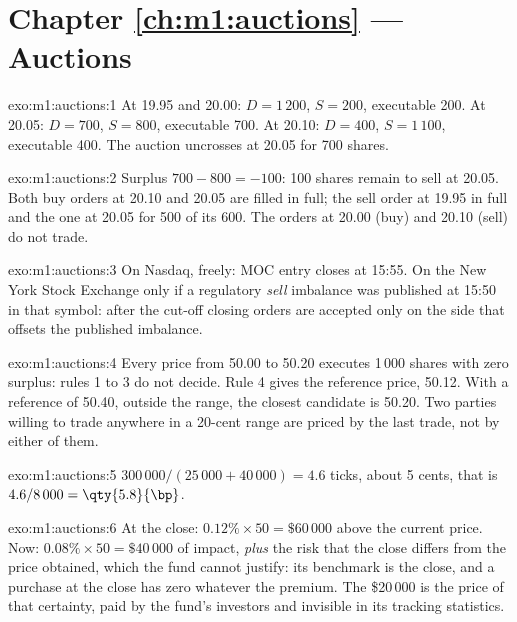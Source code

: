 \section*{Chapter \ref{ch:m1:auctions} --- Auctions}

\begin{solution}{exo:m1:auctions:1}
At 19.95 and 20.00: $D = 1\,200$, $S = 200$, executable 200. At 20.05: $D =
700$, $S = 800$, executable 700. At 20.10: $D = 400$, $S = 1\,100$,
executable 400. The auction uncrosses at 20.05 for 700 shares.
\end{solution}

\begin{solution}{exo:m1:auctions:2}
Surplus $700 - 800 = -100$: 100 shares remain to sell at 20.05. Both buy
orders at 20.10 and 20.05 are filled in full; the sell order at 19.95 in full
and the one at 20.05 for 500 of its 600. The orders at 20.00 (buy) and 20.10
(sell) do not trade.
\end{solution}

\begin{solution}{exo:m1:auctions:3}
On Nasdaq, freely: MOC entry closes at 15:55. On the New York Stock Exchange
only if a regulatory \emph{sell} imbalance was published at 15:50 in that
symbol: after the cut-off closing orders are accepted only on the side that
offsets the published imbalance.
\end{solution}

\begin{solution}{exo:m1:auctions:4}
Every price from 50.00 to 50.20 executes 1\,000 shares with zero surplus:
rules 1 to 3 do not decide. Rule 4 gives the reference price, 50.12. With a
reference of 50.40, outside the range, the closest candidate is 50.20. Two
parties willing to trade anywhere in a 20-cent range are priced by the last
trade, not by either of them.
\end{solution}

\begin{solution}{exo:m1:auctions:5}
$300\,000/(25\,000 + 40\,000) = 4.6$ ticks, about 5 cents, that is
$4.6/8\,000 = \qty{5.8}{\bp}$.
\end{solution}

\begin{solution}{exo:m1:auctions:6}
At the close: $0.12\% \times 50 = \$60\,000$ above the current price. Now:
$0.08\% \times 50 = \$40\,000$ of impact, \emph{plus} the risk that the close
differs from the price obtained, which the fund cannot justify: its
benchmark is the close, and a purchase at the close has zero 
whatever the premium. The \$20\,000 is the price of that certainty, paid by
the fund's investors and invisible in its tracking statistics.
\end{solution}

